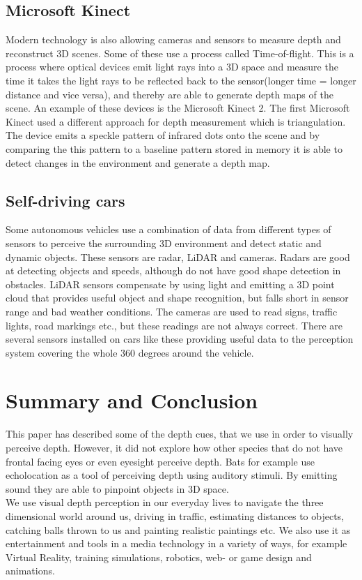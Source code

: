 	\subsection{Microsoft Kinect}
	Modern technology is also allowing cameras and sensors to measure depth and reconstruct 3D scenes. Some of these use a process called Time-of-flight. This is a process where optical devices emit light rays into a 3D space and measure the time it takes the light rays to be reflected back to the sensor(longer time = longer distance and vice versa), and thereby are able to generate depth maps of the scene. An example of these devices is the Microsoft Kinect 2\citep{tof}. The first Microsoft Kinect used a different approach for depth measurement which is triangulation. The device emits a speckle pattern of infrared dots onto the scene and by comparing the this pattern to a baseline pattern stored in memory it is able to detect changes in the environment and generate a depth map\citep{pointCloud}.
	
	\subsection{Self-driving cars}
	Some autonomous vehicles use a combination of data from different types of sensors to perceive the surrounding 3D environment and detect static and dynamic objects. These sensors are radar, LiDAR and cameras. Radars are good at detecting objects and speeds, although do not have good shape detection in obstacles. LiDAR sensors compensate by using light and emitting a 3D point cloud that provides useful object and shape recognition, but falls short in sensor range and bad weather conditions. The cameras are used to read signs, traffic lights, road markings etc., but these readings are not always correct. There are several sensors installed on cars like these providing useful data to the perception system covering the whole 360 degrees around the vehicle\citep{selfdrivingCars}.
	

\section{Summary and Conclusion}
This paper has described some of the depth cues, that we use in order to visually perceive depth. However, it did not explore how other species that do not have frontal facing eyes or even eyesight perceive depth. Bats for example use echolocation as a tool of perceiving depth using auditory stimuli. By emitting sound they are able to pinpoint objects in 3D space\citep[p.~381]{sensationPerception}.\\

We use visual depth perception in our everyday lives to navigate the three dimensional world around us, driving in traffic, estimating distances to objects, catching balls thrown to us and painting realistic paintings etc. We also use it as entertainment and tools in a media technology in a variety of ways, for example Virtual Reality, training simulations, robotics, web- or game design and animations.

